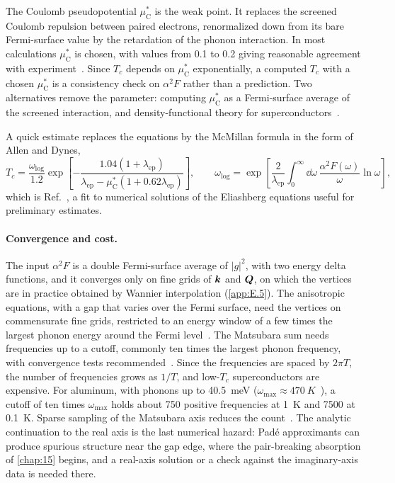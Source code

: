 The Coulomb pseudopotential $\mu^*_{\mathrm{C}}$ is the weak point. It replaces the screened Coulomb repulsion between paired electrons, renormalized down from its bare Fermi-surface value by the retardation of the phonon interaction. In most calculations $\mu^*_{\mathrm{C}}$ is chosen, with values from 0.1 to 0.2 giving reasonable agreement with experiment~\cite[Sect.~4]{lee2023electron}. Since $T_c$ depends on $\mu^*_{\mathrm{C}}$ exponentially, a computed $T_c$ with a chosen $\mu^*_{\mathrm{C}}$ is a consistency check on $\alpha^2F$ rather than a prediction. Two alternatives remove the parameter: computing $\mu^*_{\mathrm{C}}$ as a Fermi-surface average of the screened interaction, and density-functional theory for superconductors~\cite[Sect.~4]{lee2023electron}.

A quick estimate replaces the equations by the McMillan formula in the form of Allen and Dynes,
\begin{equation}
  T_c = \frac{\omega_{\log}}{1.2}\exp\left[-\frac{1.04(1 + \lambda_{\mathrm{ep}})}{\lambda_{\mathrm{ep}} - \mu^*_{\mathrm{C}}(1 + 0.62\lambda_{\mathrm{ep}})}\right], \qquad
  \omega_{\log} = \exp\left[\frac{2}{\lambda_{\mathrm{ep}}}\int_0^\infty\dd\omega\,\frac{\alpha^2F(\omega)}{\omega}\ln\omega\right] ,
  \label{eq:E.9-AD}
\end{equation}
which is Ref.~\cite[Eq.~(30)]{lee2023electron}, a fit to numerical solutions of the Eliashberg equations useful for preliminary estimates.

\paragraph{Convergence and cost.} The input $\alpha^2F$ is a double Fermi-surface average of $|g|^2$, with two energy delta functions, and it converges only on fine grids of $\bm{k}$ and $\bm{Q}$, on which the vertices are in practice obtained by Wannier interpolation (\cref{app:E.5}). The anisotropic equations, with a gap that varies over the Fermi surface, need the vertices on commensurate fine grids, restricted to an energy window of a few times the largest phonon energy around the Fermi level~\cite[Sect.~4]{lee2023electron}. The Matsubara sum needs frequencies up to a cutoff, commonly ten times the largest phonon frequency, with convergence tests recommended~\cite[Sect.~4]{lee2023electron}. Since the frequencies are spaced by $2\pi T$, the number of frequencies grows as $1/T$, and low-$T_c$ superconductors are expensive. For aluminum, with phonons up to \SI{40.5}{meV} ($\omega_{\mathrm{max}} \approx \SI{470}{K}$~\cite[Sect.~III]{savrasov1996electron}), a cutoff of ten times $\omega_{\mathrm{max}}$ holds about 750 positive frequencies at \SI{1}{K} and 7500 at \SI{0.1}{K}. Sparse sampling of the Matsubara axis reduces the count~\cite[Sect.~4]{lee2023electron}. The analytic continuation to the real axis is the last numerical hazard: Padé approximants can produce spurious structure near the gap edge, where the pair-breaking absorption of \cref{chap:15} begins, and a real-axis solution or a check against the imaginary-axis data is needed there.


